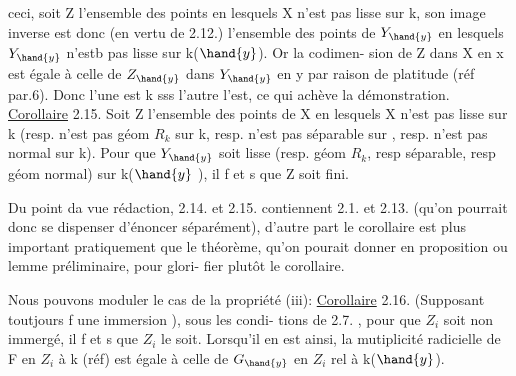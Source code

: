 
ceci, soit Z l'ensemble des points en lesquels X n'est pas lisse sur
k, son image inverse  est donc (en vertu de 2.12.)   l'ensemble des
points de $Y_{\hand{y}}$ en lesquels $Y_{\hand{y}}$ n'estb pas lisse sur k($\hand{y}$). Or  la codimen-%
sion de  Z dans X en x  est égale à celle de  $Z_{\hand{y}}$ dans $Y_{\hand{y}}$  en y par
raison de platitude (réf par.6). Donc l'une est \hand{$>$}k  sss l'autre l'est,
ce qui achève la démonstration.
\uline{Corollaire} 2.15.   Soit Z l'ensemble des points de X en lesquels
X n'est pas lisse sur k (resp. n'est pas  géom $R_k$ sur k, resp. n'est
 pas séparable sur  , resp. n'est pas  normal sur k). Pour que $Y_{\hand{y}}$ soit
lisse (resp.  géom $R_k$, resp séparable, resp géom normal) sur k($\hand{y}$ ), il
f et s  que Z soit fini.

 Du point da vue rédaction, 2.14. et 2.15.  contiennent 2.1. et
2.13. (qu'on pourrait donc se dispenser d'énoncer séparément), d'autre
part le corollaire est plus important pratiquement que le théorème,
qu'on pourait donner en proposition ou lemme préliminaire, pour glori-%
fier plutôt le corollaire.

Nous pouvons  moduler   le cas de la propriété (iii):
\uline{Corollaire} 2.16.  (Supposant toutjours f une immersion ), sous les condi-%
 tions de 2.7. , pour que $Z_i$ soit non immergé, il f et s que $Z_i$  le soit.
Lorsqu'il en est ainsi, la mutiplicité radicielle de F en $Z_i$  
à k (réf) est égale à celle de $G_{\hand{y}}$  en $Z_i$  rel à k($\hand{y}$).

